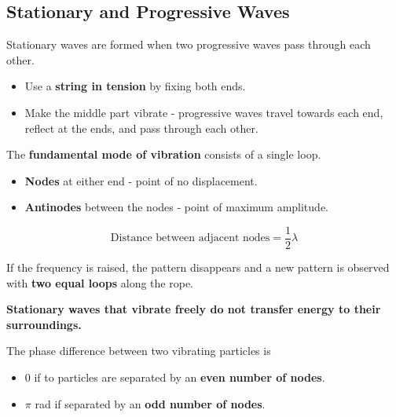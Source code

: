 \subsection{Stationary and Progressive Waves}

Stationary waves are formed when two progressive waves pass through each other.
\begin{itemize}
    \item Use a \textbf{string in tension} by fixing both ends.
    \item Make the middle part vibrate - progressive waves travel towards each end, reflect at the ends, and pass through each other.
\end{itemize}

The \textbf{fundamental mode of vibration} consists of a single loop.
\begin{itemize}
    \item \textbf{Nodes} at either end - point of no displacement.
    \item \textbf{Antinodes} between the nodes - point of maximum amplitude.
\end{itemize}
$$\text{Distance between adjacent nodes}=\frac{1}{2}\lambda$$

If the frequency is raised, the pattern disappears and a new pattern is observed with \textbf{two equal loops} along the rope.

\textbf{Stationary waves that vibrate freely do not transfer energy to their surroundings.}

The phase difference between two vibrating particles is
\begin{itemize}
    \item 0 if to particles are separated by an \textbf{even number of nodes}.
    \item $\pi$ rad if separated by an \textbf{odd number of nodes}.
\end{itemize}
